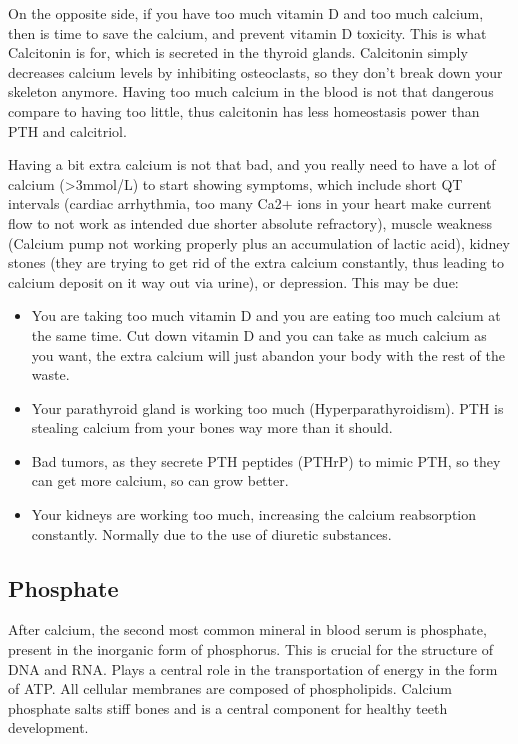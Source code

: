 On the opposite side, if you have too much vitamin D and too much calcium, then is time to save the calcium, and prevent vitamin D toxicity. This is what Calcitonin is for, which is secreted in the thyroid glands. Calcitonin simply decreases calcium levels by inhibiting osteoclasts, so they don't break down your skeleton anymore. Having too much calcium in the blood is not that dangerous compare to having too little, thus calcitonin has less homeostasis power than PTH and calcitriol.

Having a bit extra calcium is not that bad, and you really need to have a lot of calcium (>3mmol/L) to start showing symptoms, which include short QT intervals (cardiac arrhythmia, too many Ca2+ ions in your heart make current flow to not work as intended due shorter absolute refractory), muscle weakness (Calcium pump not working properly plus an accumulation of lactic acid), kidney stones (they are trying to get rid of the extra calcium constantly, thus leading to calcium deposit on it way out via urine), or depression. This may be due:

\begin{itemize}

    \item  You are taking too much vitamin D and you are eating too much calcium at the same time. Cut down vitamin D and you can take as much calcium as you want, the extra calcium will just abandon your body with the rest of the waste.
    
    \item  Your parathyroid gland is working too much (Hyperparathyroidism). PTH is stealing calcium from your bones way more than it should.
    
    \item  Bad tumors, as they secrete PTH peptides (PTHrP) to mimic PTH, so they can get more calcium, so can grow better.
    
    \item  Your kidneys are working too much, increasing the calcium reabsorption constantly. Normally due to the use of diuretic substances.
    
\end{itemize}


\subsection{Phosphate}

After calcium, the second most common mineral in blood serum is phosphate, present in the inorganic form of phosphorus. This is crucial for the structure of DNA and RNA. Plays a central role in the transportation of energy in the form of ATP. All cellular membranes are composed of phospholipids. Calcium phosphate salts stiff bones and is a central component for healthy teeth development.

